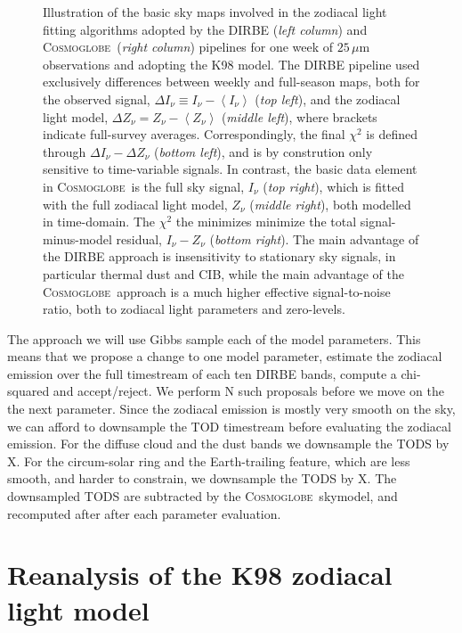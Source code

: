 \documentclass{aa}
\def\Cosmoglobe{\textsc{Cosmoglobe}}
\begin{document}
\begin{figure}
    \caption{Illustration of the basic sky maps involved in the zodiacal light fitting algorithms adopted by the DIRBE (\emph{left column}) and \Cosmoglobe\ (\emph{right column}) pipelines for one week of $25\,\mu\mathrm{m}$ observations and adopting the K98 model. The DIRBE pipeline used exclusively differences between weekly and full-season maps, both for the observed signal, $\Delta I_{\nu} \equiv I_{\nu}-\left<I_{\nu}\right>$ (\emph{top left}), and the zodiacal light model, $\Delta Z_{\nu} = Z_{\nu}-\left<Z_{\nu}\right>$ (\emph{middle left}), where brackets indicate full-survey averages. Correspondingly, the final $\chi^2$ is defined through $\Delta I_{\nu} - \Delta Z_{\nu}$ (\emph{bottom left}), and is by constrution only sensitive to time-variable signals. 
    In contrast, the basic data element in \Cosmoglobe\ is the full sky signal, $I_{\nu}$ (\emph{top right}), which is fitted with the full zodiacal light model, $Z_{\nu}$ (\emph{middle right}), both modelled in time-domain. The $\chi^2$ the minimizes minimize the total signal-minus-model residual, $I_{\nu}-Z_{\nu}$ (\emph{bottom right}). The main advantage of the DIRBE approach is insensitivity to stationary sky signals, in particular thermal dust and CIB, while the main advantage of the \Cosmoglobe\ approach is a much higher effective signal-to-noise ratio, both to zodiacal light parameters and zero-levels.}
    \label{fig:week_vs_full}
  \end{figure}


The approach we will use Gibbs sample each of the model parameters. This means that we propose a change to one model parameter, estimate the zodiacal emission over the full timestream of each ten DIRBE bands, compute a chi-squared and accept/reject. We perform N such proposals before we move on the the next parameter. Since the zodiacal emission is mostly very smooth on the sky, we can afford to downsample the TOD timestream before evaluating the zodiacal emission. For the diffuse cloud and the dust bands we downsample the TODS by X. For the circum-solar ring and the Earth-trailing feature, which are less smooth, and harder to constrain, we downsample the TODS by X. The downsampled TODS are subtracted by the \Cosmoglobe\ skymodel, and recomputed after after each parameter evaluation. 








\clearpage
\section{Reanalysis of the K98 zodiacal light model}
\end{document}
